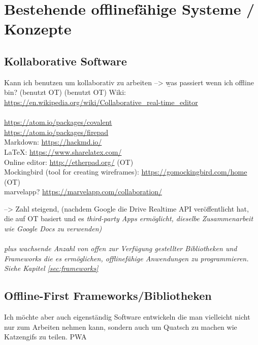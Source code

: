 \chapter{\label{chap:state}Bestehende offlinefähige Systeme / Konzepte}
%
%
\section{Kollaborative Software}
  Kann ich benutzen um kollaborativ zu arbeiten --> \b{was passiert wenn ich offline bin?}
  (benutzt OT)
  (benutzt OT)
  Wiki: \url{https://en.wikipedia.org/wiki/Collaborative_real-time_editor}\\\\
  \url{https://atom.io/packages/covalent}\\
  \url{https://atom.io/packages/firepad}\\
  Markdown: \url{https://hackmd.io/}\\
  LaTeX: \url{https://www.sharelatex.com/}\\
  Online editor: \url{http://etherpad.org/} (OT)\\
  Mockingbird (tool for creating wireframes): \url{https://gomockingbird.com/home} (OT)\\
  marvelapp? \url{https://marvelapp.com/collaboration/}

  --> Zahl steigend, (nachdem Google die Drive Realtime API veröffentlicht hat, die auf \gls{OT} basiert und es \it{third-party Apps} ermöglicht, dieselbe Zusammenarbeit wie Google Docs zu verwenden)\\\\
  \b{plus} wachsende Anzahl von offen zur Verfügung gestellter Bibliotheken und Frameworks die es ermöglichen, offlinefähige Anwendungen zu programmieren. Siehe Kapitel \ref{sec:frameworks}
%
%
\section{\label{sec:frameworks}Offline-First Frameworks/Bibliotheken}
  Ich möchte aber auch eigenständig Software entwickeln die man vielleicht nicht nur zum Arbeiten nehmen kann, sondern auch um Quatsch zu machen wie Katzengifs zu teilen.
  \Gls{PWA}
  
  

  

  

  
